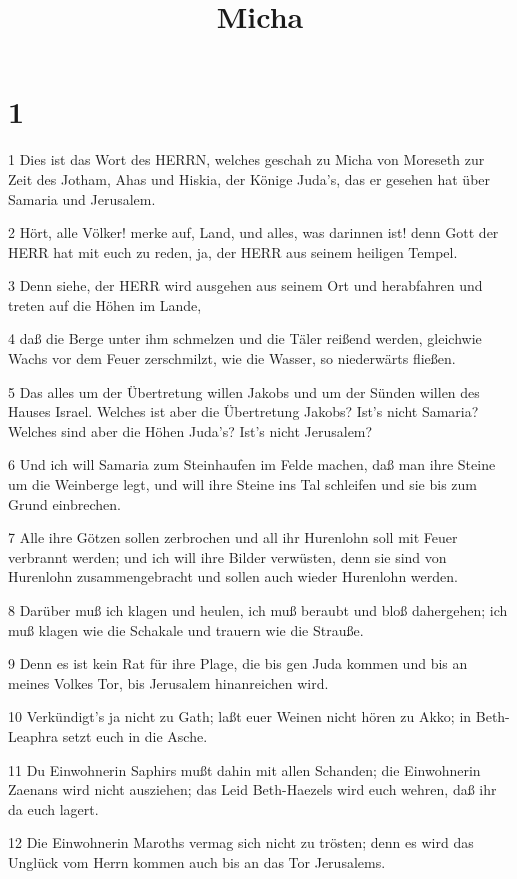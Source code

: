 

\title{Micha}


\chapter{1}

\par 1 Dies ist das Wort des HERRN, welches geschah zu Micha von Moreseth zur Zeit des Jotham, Ahas und Hiskia, der Könige Juda's, das er gesehen hat über Samaria und Jerusalem.
\par 2 Hört, alle Völker! merke auf, Land, und alles, was darinnen ist! denn Gott der HERR hat mit euch zu reden, ja, der HERR aus seinem heiligen Tempel.
\par 3 Denn siehe, der HERR wird ausgehen aus seinem Ort und herabfahren und treten auf die Höhen im Lande,
\par 4 daß die Berge unter ihm schmelzen und die Täler reißend werden, gleichwie Wachs vor dem Feuer zerschmilzt, wie die Wasser, so niederwärts fließen.
\par 5 Das alles um der Übertretung willen Jakobs und um der Sünden willen des Hauses Israel. Welches ist aber die Übertretung Jakobs? Ist's nicht Samaria? Welches sind aber die Höhen Juda's? Ist's nicht Jerusalem?
\par 6 Und ich will Samaria zum Steinhaufen im Felde machen, daß man ihre Steine um die Weinberge legt, und will ihre Steine ins Tal schleifen und sie bis zum Grund einbrechen.
\par 7 Alle ihre Götzen sollen zerbrochen und all ihr Hurenlohn soll mit Feuer verbrannt werden; und ich will ihre Bilder verwüsten, denn sie sind von Hurenlohn zusammengebracht und sollen auch wieder Hurenlohn werden.
\par 8 Darüber muß ich klagen und heulen, ich muß beraubt und bloß dahergehen; ich muß klagen wie die Schakale und trauern wie die Strauße.
\par 9 Denn es ist kein Rat für ihre Plage, die bis gen Juda kommen und bis an meines Volkes Tor, bis Jerusalem hinanreichen wird.
\par 10 Verkündigt's ja nicht zu Gath; laßt euer Weinen nicht hören zu Akko; in Beth-Leaphra setzt euch in die Asche.
\par 11 Du Einwohnerin Saphirs mußt dahin mit allen Schanden; die Einwohnerin Zaenans wird nicht ausziehen; das Leid Beth-Haezels wird euch wehren, daß ihr da euch lagert.
\par 12 Die Einwohnerin Maroths vermag sich nicht zu trösten; denn es wird das Unglück vom Herrn kommen auch bis an das Tor Jerusalems.
